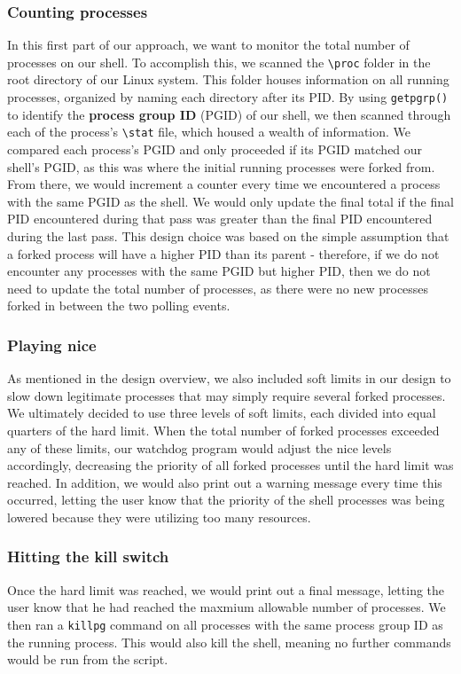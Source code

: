 \documentclass{article}
\begin{document}
\subsubsection{Counting processes}
In this first part of our approach, we want to monitor the total number of
processes on our shell. To accomplish this, we scanned the \verb+\proc+ folder
in the root directory of our Linux system. This folder houses information on
all running processes, organized by naming each directory after its PID. By 
using \verb+getpgrp()+ to identify the \textbf{process group ID} (PGID) of our 
shell, we then scanned through each of the process's \verb+\stat+ file, which 
housed a wealth of information. We compared each process's PGID and only 
proceeded if its PGID matched our shell's PGID, as this was where the initial
running processes were forked from. \\
From there, we would increment a counter every time we encountered a process 
with the same PGID as the shell. We would only update the final total if the
final PID encountered during that pass was greater than the final PID 
encountered during the last pass. This design choice was based on the simple
assumption that a forked process will have a higher PID than its parent -
therefore, if we do not encounter any processes with the same PGID but higher
PID, then we do not need to update the total number of processes, as there were
no new processes forked in between the two polling events.

\subsubsection{Playing nice}
As mentioned in the design overview, we also included soft limits in our design
to slow down legitimate processes that may simply require several forked 
processes. We ultimately decided to use three levels of soft limits, each 
divided into equal quarters of the hard limit. When the total number of forked
processes exceeded any of these limits, our watchdog program would adjust the 
nice levels accordingly, decreasing the priority of all forked processes until
the hard limit was reached. In addition, we would also print out a warning 
message every time this occurred, letting the user know that the priority of 
the shell processes was being lowered because they were utilizing too many
resources.

\subsubsection{Hitting the kill switch}
Once the hard limit was reached, we would print out a final message, letting 
the user know that he had reached the maxmium allowable number of processes.
We then ran a \verb+killpg+ command on all processes with the same process
group ID as the running process. This would also kill the shell, meaning no
further commands would be run from the script. \\
\end{document}
